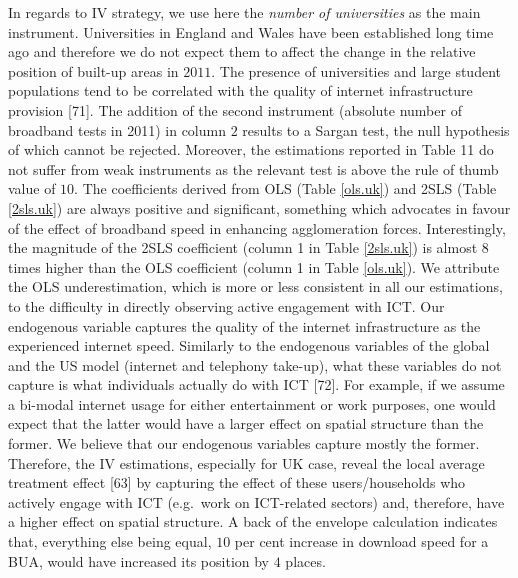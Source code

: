 \documentclass[10pt,letterpaper]{article}
\begin{document}
In regards to IV strategy, we use here the \emph{number of universities}
as the main instrument. Universities in England and Wales have been
established long time ago and therefore we do not expect them to affect
the change in the relative position of built-up areas in \(2011\). The
presence of universities and large student populations tend to be
correlated with the quality of internet infrastructure provision
{[}71{]}. \color{black} The addition of the second instrument (absolute
number of broadband tests in 2011) in column \(2\) results to a Sargan
test, the null hypothesis of which cannot be rejected. Moreover, the
estimations reported in Table 11 do not suffer from weak instruments as
the relevant test is above the rule of thumb value of \(10\). The
coefficients derived from OLS (Table \ref{ols.uk}) and 2SLS (Table
\ref{2sls.uk}) are always positive and significant, something which
advocates in favour of the effect of broadband speed in enhancing
agglomeration forces. Interestingly, the magnitude of the 2SLS
coefficient (column 1 in Table \ref{2sls.uk}) is almost 8 times higher
than the OLS coefficient (column 1 in Table \ref{ols.uk}). We attribute
the OLS underestimation, which is more or less consistent in all our
estimations, to the difficulty in directly observing active engagement
with ICT. Our endogenous variable captures the quality of the internet
infrastructure as the experienced internet speed. Similarly to the
endogenous variables of the global and the US model (internet and
telephony take-up), what these variables do not capture is what
individuals actually do with ICT {[}72{]}. For example, if we assume a
bi-modal internet usage for either entertainment or work purposes, one
would expect that the latter would have a larger effect on spatial
structure than the former. We believe that our endogenous variables
capture mostly the former. Therefore, the IV estimations, especially for
UK case, reveal the local average treatment effect {[}63{]} by capturing
the effect of these users/households who actively engage with ICT
(e.g.~work on ICT-related sectors) and, therefore, have a higher effect
on spatial structure. A back of the envelope calculation indicates that,
everything else being equal, \(10\) per cent increase in download speed
for a BUA, would have increased its position by \(4\) places.
\color{black}
\end{document}
